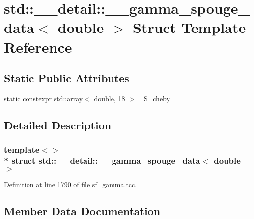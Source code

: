 \hypertarget{structstd_1_1____detail_1_1____gamma__spouge__data_3_01double_01_4}{}\section{std\+:\+:\+\_\+\+\_\+detail\+:\+:\+\_\+\+\_\+gamma\+\_\+spouge\+\_\+data$<$ double $>$ Struct Template Reference}
\label{structstd_1_1____detail_1_1____gamma__spouge__data_3_01double_01_4}
\subsection*{Static Public Attributes}
\begin{DoxyCompactItemize}
\item 
static constexpr std\+::array$<$ double, 18 $>$ \hyperlink{structstd_1_1____detail_1_1____gamma__spouge__data_3_01double_01_4_ae7638accff257079573b702a72e01254}{\+\_\+\+S\+\_\+cheby}
\end{DoxyCompactItemize}


\subsection{Detailed Description}
\subsubsection*{template$<$$>$\\*
struct std\+::\+\_\+\+\_\+detail\+::\+\_\+\+\_\+gamma\+\_\+spouge\+\_\+data$<$ double $>$}



Definition at line 1790 of file sf\+\_\+gamma.\+tcc.



\subsection{Member Data Documentation}
